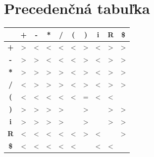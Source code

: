 \documentclass [11pt, a4paper]{article}
\begin{document}
\section{Precedenčná tabuľka}
\begin{table}[H]
\centering
\begin{tabular}{|c|c|c|c|c|c|c|c|c|c|}
\hline
   & \textbf{+} & \textbf{\--}  & \textbf{*} & \textbf{/} & \textbf{(} & \textbf{)} & \textbf{i}  & \textbf{R} & \textbf{\$} \\ \hline
\textbf{+}  & \textgreater{} & \textless{}    & \textless{}    & \textless{}    & \textless{} & \textgreater{} & \textless{} & \textgreater{} & \textgreater{} \\ \hline
\textbf{\--}  & \textgreater{} & \textgreater{} & \textless{}    & \textless{}    & \textless{} & \textgreater{} & \textless{} & \textgreater{} & \textgreater{} \\ \hline
\textbf{*}  & \textgreater{} & \textgreater{} & \textgreater{} & \textgreater{} & \textless{} & \textgreater{} & \textless{} & \textgreater{} & \textgreater{} \\ \hline
\textbf{/}  & \textless{}    & \textgreater{} & \textgreater{} & \textgreater{} & \textless{} & \textgreater{} & \textless{} & \textgreater{} & \textgreater{} \\ \hline
\textbf{(}  & \textless{}    & \textless{}    & \textless{}    & \textless{}    & \textless{} & =              & \textless{} & \textless{}    &                \\ \hline
\textbf{)}  & \textgreater{} & \textgreater{} & \textgreater{} & \textgreater{} &             & \textgreater{} &             & \textgreater{} & \textgreater{} \\ \hline
\textbf{i}  & \textgreater{} & \textgreater{} & \textgreater{} & \textgreater{} &             & \textgreater{} &             & \textgreater{} & \textgreater{} \\ \hline
\textbf{R}  & \textless{}    & \textless{}    & \textless{}    & \textless{}    & \textless{} & \textgreater{} & \textless{} &                & \textgreater{} \\ \hline
\textbf{\$} & \textless{}    & \textless{}    & \textless{}    & \textless{}    & \textless{} &                & \textless{} & \textless{}    &                \\ \hline
\end{tabular}
\end{table}
\end{document}

